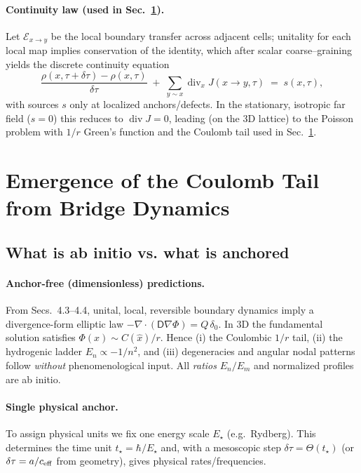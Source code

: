 \documentclass[11pt]{article}
\theoremstyle{plain}
\theoremstyle{definition}
\begin{document}
\paragraph{Continuity law (used in Sec.~\ref{sec:coulomb-derivation}).}
Let $\mathcal{E}_{x\to y}$ be the local boundary transfer across adjacent cells; unitality for each local map implies conservation of the identity, which after scalar coarse–graining yields the discrete continuity equation
\[
  \frac{\rho(x,\tau+\delta\tau)-\rho(x,\tau)}{\delta\tau}
  \;+\;\sum_{y\sim x} \operatorname{div}_x J(x\!\to\!y,\tau)
  \;=\; s(x,\tau),
\]
with sources $s$ only at localized anchors/defects.
In the stationary, isotropic far field ($s=0$) this reduces to $\operatorname{div} J=0$, leading (on the 3D lattice) to the Poisson problem with $1/r$ Green’s function and the Coulomb tail used in Sec.~\ref{sec:coulomb-derivation}.

\section{Emergence of the Coulomb Tail from Bridge Dynamics}\label{sec:coulomb-derivation}

\subsection{What is ab initio vs. what is anchored}\label{sec:abinitio-anchor}

\paragraph{Anchor-free (dimensionless) predictions.}
From Secs.~4.3–4.4, unital, local, reversible boundary dynamics imply a divergence-form elliptic law
$-\nabla\!\cdot(\mathsf D\nabla \Phi)=Q\,\delta_0$.
In 3D the fundamental solution satisfies $\Phi(x)\sim C(\hat x)/r$.
Hence (i) the Coulombic $1/r$ tail, (ii) the hydrogenic ladder $E_n\propto -1/n^2$, and (iii) degeneracies and angular nodal patterns follow \emph{without} phenomenological input.
All \emph{ratios} $E_n/E_m$ and normalized profiles are ab initio.

\paragraph{Single physical anchor.}
To assign physical units we fix one energy scale $E_\star$ (e.g.\ Rydberg).
This determines the time unit $t_\star=\hbar/E_\star$ and, with a mesoscopic step $\delta\tau=\Theta(t_\star)$ (or $\delta\tau=a/c_{\rm eff}$ from geometry), gives physical rates/frequencies.
\end{document}
